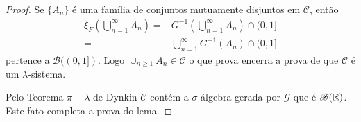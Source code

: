 \begin{proof}
Se $\{A_n\}$ é uma família de 
conjuntos mutuamente disjuntos em $\mathscr{C}$,
então 
	\begin{align*}
	\xi_F\left( \bigcup_{n=1}^{\infty} A_n\right)
	=&
	G^{-1}\left( \bigcup_{n=1}^{\infty} A_n\right)\cap (0,1]
	\\
	=&
	\bigcup_{n=1}^{\infty} G^{-1}\left(A_n \right)\cap (0,1]
	\end{align*}
pertence a $\mathscr{B}((0,1])$. Logo $\cup_{n\geq 1} A_n\in \mathscr{C}$
o que prova encerra a prova de que $\mathscr{C}$ é um $\lambda$-sistema.

Pelo Teorema $\pi-\lambda$ de Dynkin $\mathscr{C}$ contém a $\sigma$-álgebra
gerada por $\mathcal{G}$ que é $\mathscr{B}(\mathbb{R})$. Este fato 
completa a prova do lema.
\end{proof}
















